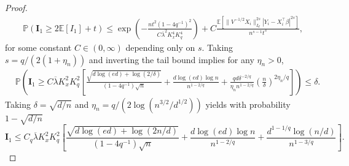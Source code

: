 \documentclass[11pt]{article}
\begin{document}
\begin{appendices}
\begin{proof}
\begin{equation}
\begin{split}
&\mathbb{P}\left(\mathbf{I}_1 \ge 2\mathbb{E}[I_1] + t\right) \le \exp\left(-\frac{nt^2(1-4q^{-1})^2}{C\overline{\lambda}^2K_x^4K_q^4}\right) + C\frac{\mathbb{E}[\|V^{-1/2}X_i\|_{I_d}^{2s}|Y_i - X_i^{\top}\beta|^{2s}]}{n^{s-1}t^s},
\end{split}
\end{equation}
for some constant $C\in(0,\infty)$ depending only on $s$. Taking $s = q/(2(1+\eta_n))$ and inverting the tail bound implies for any $\eta_n > 0$,
\begin{equation}\label{eq:quantity-I-1}
\begin{split}
&\mathbb{P}\left(\mathbf{I}_1 \ge C\overline{\lambda}K_x^2K_q^2\left[\frac{\sqrt{d\log(ed) + \log(2/\delta)}}{(1-4q^{-1})\sqrt{n}} + \frac{d\log(ed)\log n}{n^{1-2/q}} + \frac{qd\delta^{-2/q}}{\eta_n n^{1-2/q}}{\left(\frac{n}{\delta}\right)^{2\eta_n/q}}\right]\right) \le \delta.
\end{split}
\end{equation}
Taking $\delta = \sqrt{d/n}$ and $\eta_n = q/(2\log(n^{3/2}/d^{1/2}))$ yields with probability $1 - \sqrt{d/n}$
\begin{equation}\label{eq:quantity-I-1-again}
\mathbf{I}_1 \le C_q\overline{\lambda}K_x^2K_q^2\left[\frac{\sqrt{d\log(ed) + \log(2n/d)}}{(1-4q^{-1})\sqrt{n}} + \frac{d\log(ed)\log n}{n^{1-2/q}} + \frac{d^{1-1/q}\log(n/d)}{n^{1-3/q}}\right].
\end{equation}


\end{proof}
\end{appendices}
\end{document}
